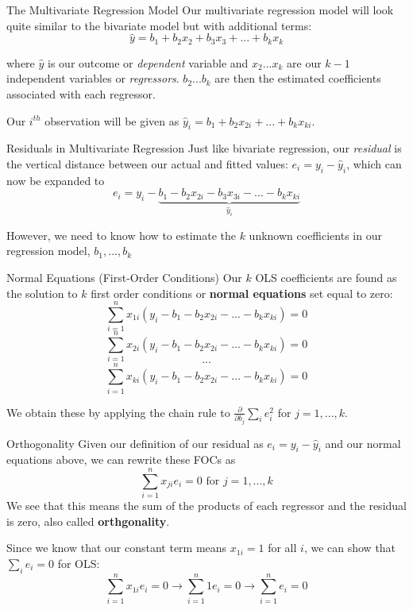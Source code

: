 \documentclass[
  ignorenonframetext,
  english,
]{beamer}
\begin{document}
\begin{frame}{The Multivariate Regression Model}
\protect{}\label{the-multivariate-regression-model}
Our multivariate regression model will look quite similar to the
bivariate model but with additional terms:
\[\hat{y}=b_1+b_2x_2+b_3x_3+...+b_kx_k\]

where \(\hat{y}\) is our outcome or \emph{dependent} variable and
\(x_2...x_k\) are our \(k-1\) independent variables or
\emph{regressors}. \(b_2...b_k\) are then the estimated coefficients
associated with each regressor.

Our \(i^{th}\) observation will be given as
\(\hat{y}_i=b_1+b_2x_{2i}+...+b_kx_{ki}\).
\end{frame}

\begin{frame}{Residuals in Multivariate Regression}
\protect{}\label{residuals-in-multivariate-regression}
Just like bivariate regression, our \emph{residual} is the vertical
distance between our actual and fitted values: \(e_i=y_i-\hat{y}_i\),
which can now be expanded to
\[e_i=y_i-\underbrace{b_1-b_2x_{2i}-b_3x_{3i}-...-b_kx_{ki}}_{\hat{y}_i}\]

However, we need to know how to estimate the \(k\) unknown coefficients
in our regression model, \(b_1,...,b_k\)
\end{frame}

\begin{frame}{Normal Equations (First-Order Conditions)}
\protect{}\label{normal-equations-first-order-conditions}
Our \(k\) OLS coefficients are found as the solution to \(k\) first
order conditions or \textbf{normal equations} set equal to zero:
\[\sum_{i=1}^nx_{1i}(y_i-b_1-b_2x_{2i}-...-b_kx_{ki})=0\]
\[\sum_{i=1}^nx_{2i}(y_i-b_1-b_2x_{2i}-...-b_kx_{ki})=0\] \[...\]
\[\sum_{i=1}^nx_{ki}(y_i-b_1-b_2x_{2i}-...-b_kx_{ki})=0\]

We obtain these by applying the chain rule to
\(\frac{\partial}{\partial b_j}\sum_i e_i^2\) for \(j=1,...,k\).
\end{frame}

\begin{frame}{Orthogonality}
\protect{}\label{orthogonality}
Given our definition of our residual as \(e_i=y_i-\hat{y}_i\) and our
normal equations above, we can rewrite these FOCs as
\[\sum_{i=1}^nx_{ji}e_i=0\text{ for }j=1,...,k\] We see that this means
the sum of the products of each regressor and the residual is zero, also
called \textbf{orthgonality}.

Since we know that our constant term means \(x_{1i}=1\) for all \(i\),
we can show that \(\sum_ie_i=0\) for OLS:
\[\sum_{i=1}^nx_{1i}e_i=0\rightarrow\sum_{i=1}^n1e_i=0\rightarrow\sum_{i=1}^ne_i=0\]
\end{frame}
\end{document}
